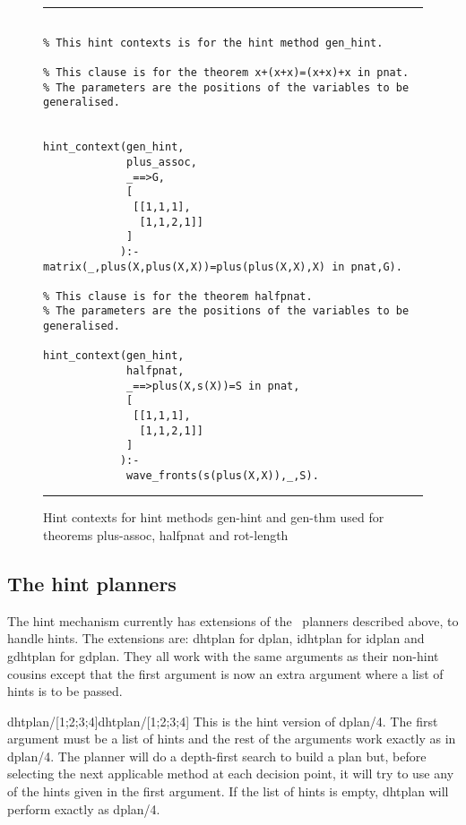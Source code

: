 \begin{figure}[htb] \begin{center} %
\hrule
\begin{small} 
\begin{verbatim}

% This hint contexts is for the hint method gen_hint.

% This clause is for the theorem x+(x+x)=(x+x)+x in pnat.
% The parameters are the positions of the variables to be generalised. 


hint_context(gen_hint,
             plus_assoc,             
             _==>G,
             [
              [[1,1,1],
               [1,1,2,1]]
             ]
            ):- matrix(_,plus(X,plus(X,X))=plus(plus(X,X),X) in pnat,G).

% This clause is for the theorem halfpnat.
% The parameters are the positions of the variables to be generalised.

hint_context(gen_hint,
             halfpnat,
             _==>plus(X,s(X))=S in pnat,
             [
              [[1,1,1],
               [1,1,2,1]]
             ]
            ):-
             wave_fronts(s(plus(X,X)),_,S).

\end{verbatim}
\end{small}
\end{center}
\caption{Hint contexts for hint methods gen-hint and gen-thm used
for theorems plus-assoc, halfpnat and rot-length} 
\label{contexts}
\hrule
\end{figure}

\subsection {The hint planners}

        The hint mechanism currently has extensions of the \clam\
planners described above, to handle hints. The extensions are: dhtplan
for dplan, idhtplan for idplan and gdhtplan for gdplan. They all work
with the same arguments as their non-hint cousins except that the first
argument is now an extra argument where a list of hints is to be passed.

\begin{predicate}{dhtplan/[1;2;3;4]}{dhtplan/[1;2;3;4]}%
        This is the hint version of dplan/4. The first argument must be
a list of hints and the rest of the arguments work exactly as in
dplan/4.  The planner will do a depth-first search to build a plan but,
before selecting the next applicable method at each decision point, it
will try to use any of the hints given in the first argument. If the
list of hints is empty, dhtplan will perform exactly as dplan/4.
\end{predicate}

